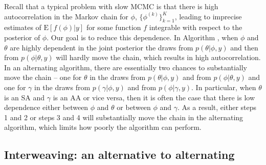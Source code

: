 \documentclass{article}
\begin{document}
Recall that a typical problem with slow MCMC is that there is high autocorrelation in the Markov chain for $\phi$, $\{\phi^{(k)}\}_{k=1}^K$, leading to imprecise estimates of $\mathrm{E}[f(\phi)|y]$ for some function $f$ integrable with respect to the posterior of $\phi$. Our goal is to reduce this dependence. In Algorithm , when $\phi$ and $\theta$ are highly dependent in the joint posterior the draws from $p(\theta|\phi,y)$ and then from $p(\phi|\theta,y)$ will hardly move the chain, which results in high autocorrelation. In an alternating algorithm, there are essentially two chances to substantially move the chain -- one for $\theta$ in the draws from $p(\theta|\phi,y)$ and from $p(\phi|\theta,y)$ and one for $\gamma$ in the draws from $p(\gamma|\phi,y)$ and from $p(\phi|\gamma,y)$.  In particular, when $\theta$ is an SA and $\gamma$ is an AA or vice versa, then it is often the case that there is low dependence either between $\phi$ and $\theta$ or between $\phi$ and $\gamma$. As a result, either steps 1 and 2 or steps 3 and 4 will substantially move the chain in the alternating algorithm, which limits how poorly the algorithm can perform.

\subsection{Interweaving: an alternative to alternating}\label{sec:Intro:int}
\end{document}
